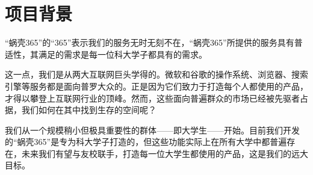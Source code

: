 \section{项目背景}
“蜗壳365”的“365”表示我们的服务无时无刻不在，“蜗壳365”所提供的服务具有普适性，其满足的需求是每一位科大学子都具有的需求。

这一点，我们是从两大互联网巨头学得的。微软和谷歌的操作系统、浏览器、搜索引擎等服务都是面向普罗大众的。正是因为它们致力于打造每个人都使用的产品，才得以攀登上互联网行业的顶峰。然而，这些面向普遍群众的市场已经被先驱者占据，我们如何在其中找到生存的空间呢？

我们从一个规模稍小但极具重要性的群体——即大学生——开始。目前我们开发的“蜗壳365”是专为科大学子打造的，但这些功能实际上在所有大学中都普遍存在，未来我们有望与友校联手，打造每一位大学生都使用的产品，这是我们的远大目标。
